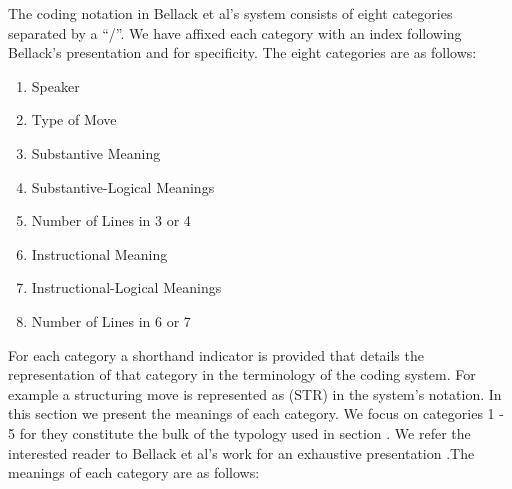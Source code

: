 \documentclass[conference]{IEEEtran}
\begin{document}
The coding notation in Bellack et al's system consists of eight categories
separated by a ``/''. We have affixed each category with an index following
Bellack's presentation and for specificity. The eight categories are as follows:

\begin{enumerate}
  \item Speaker
  \item Type of Move
  \item Substantive Meaning
  \item Substantive-Logical Meanings
  \item Number of Lines in 3 or 4
  \item Instructional Meaning
  \item Instructional-Logical Meanings
  \item Number of Lines in 6 or 7
\end{enumerate}

For each category a shorthand indicator is provided that details the
representation of that category in the terminology of the coding system.
For example a structuring move is represented as (STR) in the system's
notation. In this section we present the meanings of each category. We focus on
categories 1 - 5 for they constitute the bulk of the typology used in section
. We refer the interested reader to Bellack et al's work for an
exhaustive presentation \cite{bellack1966language}.The meanings of each category are as follows:
\end{document}
